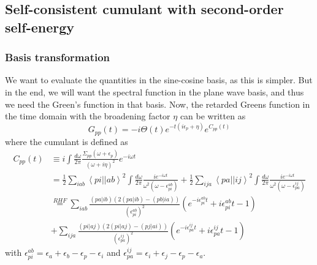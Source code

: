 \subsection{Self-consistent cumulant with second-order self-energy}
\subsubsection{Basis transformation}
We want to evaluate the quantities in the sine-cosine basis, as this is simpler. But in the end, we will want the spectral function in the plane wave basis, and thus we need the Green's function in that basis. Now, the retarded Greens function in the time domain with the broadening factor $\eta$ can be written as
\begin{equation}
    G_{pp}(t) = -i \Theta(t) e^{-t(i \epsilon_p +\eta)} e^{C_{pp}(t)}
\end{equation}
where the cumulant is defined as
\begin{align}
    C_{pp}(t) &\equiv i \int \frac{d\omega}{2\pi} \frac{ \Sigma_{pp}\left(\omega+\epsilon_p\right)}{(\omega + i \eta)^2} e^{-i \omega t} \\
 &= \frac{1}{2} \sum_{iab} \left< pi \left| \right| ab \right>^2 \int \frac{d\omega}{2\pi} \frac{i e^{-i \omega t}}{\omega^2\left(\omega-\epsilon_{pi}^{ab}\right)} + \frac{1}{2} \sum_{ija} \left< pa \left| \right| ij \right>^2 \int \frac{d\omega}{2\pi} \frac{i e^{-i \omega t}}{\omega^2\left(\omega-\epsilon_{pa}^{ij}\right)} \\
&\overset{RHF}{=} \sum_{iab} \frac{(pa|ib)\left(2(pa|ib)- (pb|ia)\right)}{\left(\epsilon_{pi}^{ab}\right)^2}
\left(e^{-i \epsilon_{pi}^{ab} t} +i \epsilon_{pi}^{ab} t -1 \right)
\\&+\sum_{ija} \frac{(pi|aj)\left(2(pi|aj)- (pj|ai)\right)}{\left(\epsilon_{pa}^{ij}\right)^2} \left(e^{-i \epsilon_{pa}^{ij} t} +i \epsilon_{pa}^{ij} t -1 \right)
\end{align}
with $\epsilon_{pi}^{ab} = \epsilon_{a}+\epsilon_{b}-\epsilon_{p}-\epsilon_{i}$
and
$\epsilon_{pa}^{ij} = \epsilon_{i}+\epsilon_{j}-\epsilon_{p}-\epsilon_{a}$. 

